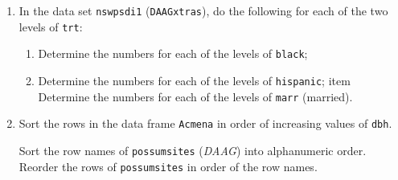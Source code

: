 \documentclass{tufte-book}\usepackage[]{graphicx}\usepackage[]{color}
\begin{document}
\begin{enumerate}
\item In the data set \texttt{nswpsdi1} (\texttt{DAAGxtras}), do
the following for each of the two levels of \texttt{trt}:
\begin{enumerate}
  \item Determine the numbers for each of the levels of \texttt{black};
  \item Determine the numbers for each of the levels of \texttt{hispanic};
  item Determine the numbers for each of the levels of \texttt{marr} (married).
\end{enumerate}

\item Sort the rows in the data frame \texttt{Acmena} in order
of increasing values of \texttt{dbh}.

\begin{Schunk}
\end{Schunk}

Sort the row names of \texttt{possumsites} (\textit{DAAG}) into
alphanumeric order.  Reorder the rows of \texttt{possumsites} in order
of the row names.


\end{enumerate}
\end{document}
